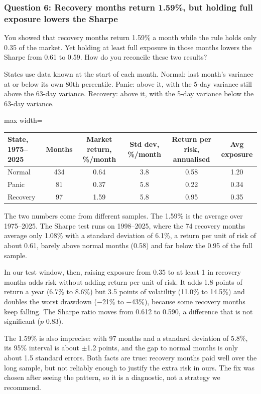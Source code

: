 \subsubsection*{Question 6: Recovery months return 1.59\%, but holding full exposure lowers the Sharpe}
\begin{question}
You showed that recovery months return 1.59\% a month while the rule holds only 0.35 of the market. Yet holding at least full exposure in those months lowers the Sharpe from 0.61 to 0.59. How do you reconcile these two results?
\end{question}
States use data known at the start of each month. Normal: last month's variance at or below its own 80th percentile. Panic: above it, with the 5-day variance still above the 63-day variance. Recovery: above it, with the 5-day variance below the 63-day variance.
\begin{center}\small
\begin{adjustbox}{max width=\linewidth}\begin{tabular}{@{}lccccc@{}}
\toprule
State, 1975--2025 & Months & Market return, \%/month & Std dev, \%/month & Return per risk, annualised & Avg exposure\\
\midrule
Normal & 434 & 0.64 & 3.8 & 0.58 & 1.20\\
Panic & 81 & 0.37 & 5.8 & 0.22 & 0.34\\
Recovery & 97 & 1.59 & 5.8 & 0.95 & 0.35\\
\bottomrule
\end{tabular}\end{adjustbox}
\end{center}
The two numbers come from different samples. The 1.59\% is the average over 1975--2025. The Sharpe test runs on 1998--2025, where the 74 recovery months average only 1.08\% with a standard deviation of 6.1\%, a return per unit of risk of about 0.61, barely above normal months (0.58) and far below the 0.95 of the full sample.

In our test window, then, raising exposure from 0.35 to at least 1 in recovery months adds risk without adding return per unit of risk. It adds 1.8 points of return a year (6.7\% to 8.6\%) but 3.5 points of volatility (11.0\% to 14.5\%) and doubles the worst drawdown ($-$21\% to $-$43\%), because some recovery months keep falling. The Sharpe ratio moves from 0.612 to 0.590, a difference that is not significant ($p$ 0.83).

The 1.59\% is also imprecise: with 97 months and a standard deviation of 5.8\%, its 95\% interval is about $\pm$1.2 points, and the gap to normal months is only about 1.5 standard errors. Both facts are true: recovery months paid well over the long sample, but not reliably enough to justify the extra risk in ours. The fix was chosen after seeing the pattern, so it is a diagnostic, not a strategy we recommend.

